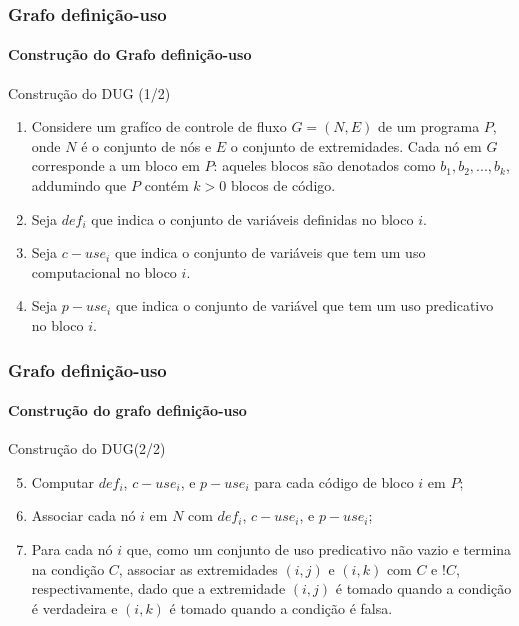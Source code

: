 \begin{frame}
\label{concept:dug-construction}
\frametitle{Grafo definição-uso}
\framesubtitle{Construção do Grafo definição-uso}

\begin{block:procedure}{Construção do DUG (1/2)}
\begin{enumerate}
	\item Considere um grafíco de controle de fluxo $G = (N, E)$ de um programa $P$, onde 
	$N$ é o conjunto de nós e $E$ o conjunto de extremidades. Cada nó em $G$ 
	corresponde a um bloco em $P$: aqueles blocos são denotados como 
	$b_1, b_2, ..., b_k$, addumindo que $P$ contém $k > 0$ blocos de código.

	\item Seja $def_i$ que indica o conjunto de variáveis definidas no bloco $i$.

	\item Seja $c-use_i$ que indica o conjunto de variáveis que tem um uso computacional no bloco $i$.

	\item Seja $p-use_i$ que indica o conjunto de variável que tem um uso predicativo no bloco $i$.
\end{enumerate}
\end{block:procedure}

\hfill
{}
\end{frame}



\begin{frame}
\frametitle{Grafo definição-uso}
\framesubtitle{Construção do grafo definição-uso}

\begin{block:procedure}{Construção do DUG(2/2)}
\begin{enumerate}
	\setcounter{enumi}{4}
	\item Computar $def_i$, $c-use_i$, e $p-use_i$ para cada código de bloco $i$ em $P$;

	\item Associar cada nó $i$ em $N$ com $def_i$, $c-use_i$, e $p-use_i$;

	\item Para cada nó $i$ que, como um conjunto de uso predicativo não vazio e termina na 
	condição $C$, associar as extremidades $(i, j)$ e $(i, k)$ com $C$ e $!C$,
	respectivamente, dado que a extremidade $(i, j)$ é tomado quando a condição é verdadeira
	e $(i, k)$ é tomado quando a condição é falsa.
\end{enumerate}
\end{block:procedure}

\hfill
{}
\end{frame}